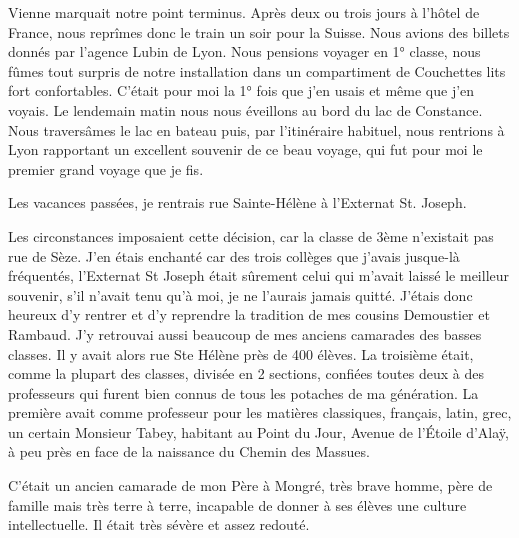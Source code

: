 \documentclass[11pt,a4paper]{report}
\begin{document}
Vienne marquait notre point terminus. Après deux ou trois jours à l'hôtel de France, nous reprîmes donc le train un soir pour la Suisse. Nous avions des billets donnés par l'agence Lubin de Lyon. Nous pensions voyager en 1° classe, nous fûmes tout surpris de notre installation dans un compartiment de Couchettes lits fort confortables. C'était pour moi la 1° fois que j'en usais et même que j'en voyais. Le lendemain matin nous nous éveillons au bord du lac de Constance. Nous traversâmes le lac en bateau puis, par l'itinéraire habituel, nous rentrions à Lyon rapportant un excellent souvenir de ce beau voyage, qui fut pour moi le premier grand voyage que je fis.

Les vacances passées, je rentrais rue Sainte-Hélène à l'Externat St. Joseph.

Les circonstances imposaient cette décision, car la classe de 3ème n'existait pas rue de Sèze. J'en étais enchanté car des trois collèges que j'avais jusque-là fréquentés, l'Externat St Joseph était sûrement celui qui m'avait laissé le meilleur souvenir, s'il n'avait tenu qu'à moi, je ne l'aurais jamais quitté. J'étais donc heureux d'y rentrer et d'y reprendre la tradition de mes cousins Demoustier et Rambaud. J'y retrouvai aussi beaucoup de mes anciens camarades des basses classes. Il y avait alors rue Ste Hélène près de 400 élèves. La troisième était, comme la plupart des classes, divisée en 2 sections, confiées toutes deux à des professeurs qui furent bien connus de tous les potaches de ma génération. La première avait comme professeur pour les matières classiques, français, latin, grec, un certain Monsieur Tabey, habitant au Point du Jour, Avenue de l'Étoile d'Alaÿ, à peu près en face de la naissance du Chemin des Massues.

C'était un ancien camarade de mon Père à Mongré, très brave homme, père de famille mais très terre à terre, incapable de donner à ses élèves une culture intellectuelle. Il était très sévère et assez redouté.
\end{document}
